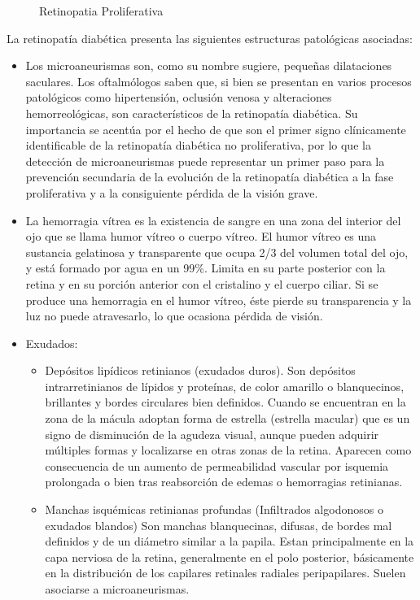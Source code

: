 \begin{itemize}
\begin{enumerate}
\begin{figure}[H]
{	\caption[Retinopatia Proliferativa]{Retinopatia Proliferativa}
	\label{fig:RetinopatiaProliferativa}
	}
\end{figure}
\end{enumerate}
La retinopat\'ia diab\'etica presenta las siguientes estructuras patol\'ogicas asociadas:
\begin{itemize}
	\item Los microaneurismas son, como su nombre sugiere, pequeñas dilataciones saculares. Los oftalm\'ologos saben que, si bien se presentan en varios procesos patol\'ogicos como hipertensi\'on, oclusi\'on venosa y alteraciones hemorreol\'ogicas, son caracter\'isticos de la retinopat\'ia diab\'etica. Su importancia se acent\'ua por el hecho de que son el primer signo cl\'inicamente identificable de la retinopat\'ia diab\'etica no proliferativa, por lo que la detecci\'on de microaneurismas puede representar un primer paso para la prevenci\'on secundaria de la evoluci\'on de la retinopat\'ia diab\'etica a la fase proliferativa y a la consiguiente p\'erdida de la visi\'on grave.
\item La hemorragia v\'itrea es la existencia de sangre en una zona del interior del ojo que se llama humor v\'itreo o cuerpo v\'itreo. El humor v\'itreo es una sustancia gelatinosa y transparente que ocupa 2/3 del volumen total del ojo, y est\'a formado por agua en un 99\%. Limita en su parte posterior con la retina y en su porci\'on anterior con el cristalino y el cuerpo ciliar. Si se produce una hemorragia en el humor v\'itreo, \'este pierde su transparencia y la luz no puede atravesarlo, lo que ocasiona p\'erdida de visi\'on.
\item	Exudados:
\begin{itemize}
	\item Dep\'ositos lip\'idicos retinianos (exudados duros). Son dep\'ositos intrarretinianos de l\'ipidos y prote\'inas, de color amarillo o blanquecinos, brillantes y bordes circulares bien definidos. Cuando se encuentran en la zona de la m\'acula adoptan forma de estrella (estrella macular) que es un signo de disminuci\'on de la agudeza visual, aunque pueden adquirir m\'ultiples formas y localizarse en otras zonas de la retina. Aparecen como consecuencia de un aumento de permeabilidad vascular por isquemia prolongada o bien tras reabsorci\'on de edemas o hemorragias retinianas. 
\item Manchas isqu\'emicas retinianas profundas (Infiltrados algodonosos o exudados blandos) Son manchas blanquecinas, difusas, de bordes mal definidos y de un di\'ametro similar a la papila. Estan principalmente en la capa nerviosa de la retina, generalmente en el polo posterior, b\'asicamente en la distribuci\'on de los capilares retinales radiales peripapilares. Suelen asociarse a microaneurismas.
\end{itemize}
\end{itemize}


\end{itemize}

